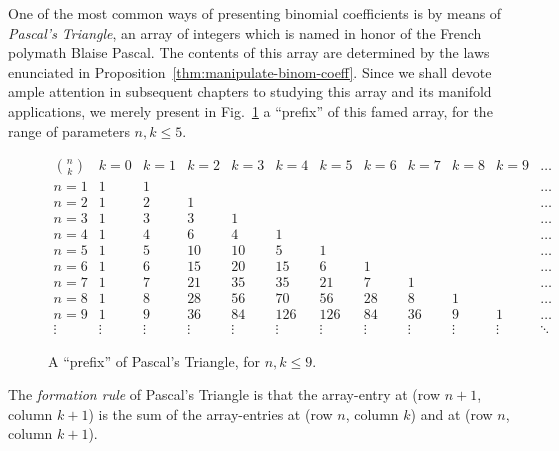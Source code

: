  

One of the most common ways of presenting binomial coefficients is by means of {\it Pascal's Triangle}, an array of integers which is named in honor of the French polymath Blaise Pascal. The contents of this array are determined by the laws enunciated in Proposition~\ref{thm:manipulate-binom-coeff}.  Since we shall devote ample attention in subsequent chapters to studying this array and its manifold applications, we merely present in Fig.~\ref{fig:pascal-triangle} a ``prefix'' of this famed array, for the range of parameters $n,k \leq 5$.
\begin{figure}[ht]
\[
\begin{array}{c||r|r|r|r|r|r|r|r|r|r|r}
{\displaystyle {n \choose k}} & k=0 & k=1 & k=2 & k=3 & k=4 & k=5 &
k=6 & k=7 & k=8 & k=9 & \ldots \\
\hline
\hline
n=1 & 1 & 1 &    &    &     &     &    &    &   &   & \ldots \\
\hline
n=2 & 1 & 2 &  1 &    &     &     &    &    &   &   & \ldots \\
\hline
n=3 & 1 & 3 &  3 &  1 &     &     &    &    &   &   & \ldots \\
\hline
n=4 & 1 & 4 &  6 &  4 &   1 &     &    &    &   &   & \ldots \\
\hline
n=5 & 1 & 5 & 10 & 10 &   5 &   1 &    &    &   &   & \ldots \\
\hline
n=6 & 1 & 6 & 15 & 20 &  15 &   6 &  1 &    &   &   & \ldots \\
\hline
n=7 & 1 & 7 & 21 & 35 &  35 &  21 &  7 &  1 &   &   & \ldots \\
\hline
n=8 & 1 & 8 & 28 & 56 &  70 &  56 & 28 &  8 & 1 &   & \ldots \\
\hline
n=9 & 1 & 9 & 36 & 84 & 126 & 126 & 84 & 36 & 9 & 1 & \ldots \\
\hline
\vdots &\vdots &\vdots &\vdots &\vdots &\vdots &\vdots &\vdots &\vdots
&\vdots &\vdots &\ddots
\end{array}
\]
\caption{A ``prefix'' of Pascal's Triangle, for $n,k \leq 9$.}
\label{fig:pascal-triangle}
\end{figure}
The {\em formation rule} of Pascal's Triangle is that the array-entry at (row $n+1$, column $k+1$) is the sum of the array-entries at (row $n$, column $k$) and at (row $n$, column $k+1$).


\bigskip

\noindent {}

